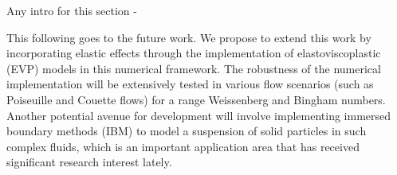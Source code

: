 Any intro for this section - 
\par
{\color{red} This following goes to the future work.}
We propose to extend this work by incorporating elastic effects through the implementation of elastoviscoplastic (EVP) models in this numerical framework. The robustness of the numerical implementation will be extensively tested in various flow scenarios (such as Poiseuille and Couette flows) for a range Weissenberg and Bingham numbers.  Another potential avenue for development will involve implementing immersed boundary methods (IBM) to model a suspension of solid particles in such complex fluids, which is an important application area that has received significant research interest lately. 


